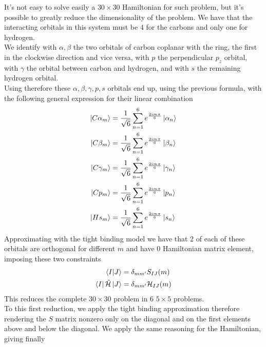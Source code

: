\documentclass[../qm.tex]{subfiles}
\begin{document}
	It's not easy to solve easily a $30\times30$ Hamiltonian for such problem, but it's possible to greatly reduce the dimensionality of the problem. We have that the interacting orbitals in this system must be 4 for the carbons and only one for hydrogen.\\
	We identify with $\alpha,\beta$ the two orbitals of carbon coplanar with the ring, the first in the clockwise direction and vice versa, with $p$ the perpendicular $p_z$ orbital, with $\gamma$ the orbital between carbon and hydrogen, and with $s$ the remaining hydrogen orbital.\\
	Using therefore these $\alpha,\beta,\gamma,p,s$ orbitals end up, using the previous formula, with the following general expression for their linear combination
	\begin{equation}
		\begin{aligned}
			\ket{C\alpha_m}&=\frac{1}{\sqrt{6}}\sum_{n=1}^6e^{\frac{2im\pi}{6}}\ket{\alpha_n}\\
			\ket{C\beta_m}&=\frac{1}{\sqrt{6}}\sum_{n=1}^6e^{\frac{2im\pi}{6}}\ket{\beta_n}\\
			\ket{C\gamma_m}&=\frac{1}{\sqrt{6}}\sum_{n=1}^6e^{\frac{2im\pi}{6}}\ket{\gamma_n}\\
			\ket{Cp_m}&=\frac{1}{\sqrt{6}}\sum_{n=1}^6e^{\frac{2im\pi}{6}}\ket{p_n}\\
			\ket{Hs_m}&=\frac{1}{\sqrt{6}}\sum_{n=1}^6e^{\frac{2im\pi}{6}}\ket{s_n}
		\end{aligned}
		\label{eq:benzenebasis}
	\end{equation}
	Approximating with the tight binding model we have that 2 of each of these orbitals are orthogonal for different $m$ and have 0 Hamiltonian matrix element, imposing these two constraints
	\begin{equation}
		\begin{aligned}
			\bra{I}\ket{J}&=\delta_{mm'}S_{IJ}(m)\\
			\bra{I}\hat{\mathcal{H}}\ket{J}&=\delta_{mm'}\mathcal{H}_{IJ}(m)
		\end{aligned}
		\label{eq:benzeneconstr}
	\end{equation}
	This reduces the complete $30\times30$ problem in 6 $5\times5$ problems.\\
	To this first reduction, we apply the tight binding approximation therefore rendering the $S$ matrix nonzero only on the diagonal and on the first elements above and below the diagonal. We apply the same reasoning for the Hamiltonian, giving finally
\end{document}
